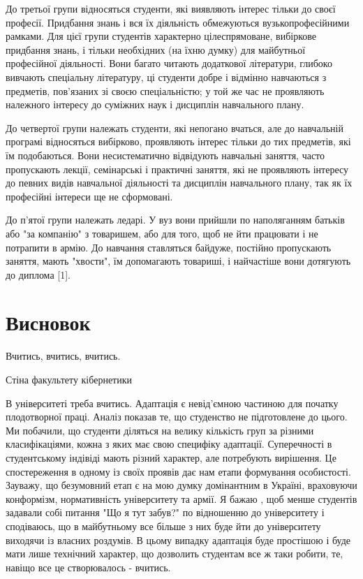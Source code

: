 \documentclass[a4paper,12pt, titlepage]{article}
\begin{document}
    До третьої групи відносяться студенти, які виявляють інтерес
    тільки до своєї професії. Придбання знань і вся їх діяльність
    обмежуються вузькопрофесійними рамками. Для цієї групи
    студентів характерно цілеспрямоване, вибіркове придбання
    знань, і тільки необхідних (на їхню думку) для майбутньої
    професійної діяльності. Вони багато читають додаткової
    літератури, глибоко вивчають спеціальну літературу, ці студенти добре
    і відмінно навчаються з предметів, пов'язаних зі своєю спеціальністю; у той же
    час не проявляють належного інтересу до суміжних наук і дисциплін
    навчального плану.

    До четвертої групи належать студенти, які непогано вчаться, але до
    навчальній програмі відносяться вибірково, проявляють інтерес тільки до тих
    предметів, які їм подобаються. Вони несистематично відвідують навчальні
    заняття, часто пропускають лекції, семінарські і практичні заняття, які не
    проявляють інтересу до певних видів навчальної діяльності та
    дисциплін навчального плану, так як їх професійні інтереси ще не
    сформовані.

    До п'ятої групи належать ледарі. У вуз вони прийшли по
    наполяганням батьків або "за компанію" з товаришем, або для того, щоб
    не йти працювати і не потрапити в армію. До навчання ставляться байдуже,
    постійно пропускають заняття, мають "хвости", їм допомагають товариші, і
    найчастіше вони дотягують до диплома [1].

    \section{Висновок}
    \epigraph{Вчитись, вчитись, вчитись.}{Стіна факультету кібернетики}
    В університеті треба вчитись. Адаптація є невід'ємною частиною для початку плодотворної праці.
    Аналіз показав те, що студенство не підготовлене до цього. Ми побачили, що студенти діляться
    на велику кількість груп за різними класифікаціями, кожна з яких має свою специфіку адаптації.
    Суперечності в студентському індівіді мають різний характер, але потребують вирішення. Це
    спостереження в одному із своїх проявів дає нам етапи формування особистості.
    Зауважу, що безумовний етап є на мою думку домінантним в Україні, враховуючи конформізм,
    нормативність університету та армії. Я бажаю , щоб менше студентів задавали собі питання
    "Що я тут забув?" по відношенню до університету і сподіваюсь, що в майбутньому все більше з них
    буде йти до університету виходячи із власних роздумів. В цьому випадку адаптація буде простішою і
    буде мати лише технічний характер, що дозволить студентам все ж таки робити, те, навіщо все це
    створювалось - вчитись.
\end{document}
